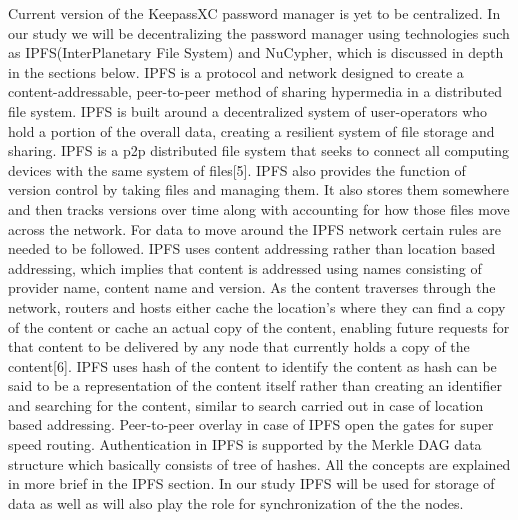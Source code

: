 \documentclass[12pt]{article}
\begin{document}
Current version of the KeepassXC password manager is yet to be centralized. In our study we will be decentralizing the password manager using technologies such as IPFS(InterPlanetary File System) and NuCypher, which is discussed in depth in the sections below. IPFS is a  protocol and network designed to create a content-addressable, peer-to-peer method of sharing hypermedia in a distributed file system.  IPFS is built around a decentralized system of user-operators who hold a portion of the overall data, creating a resilient system of file storage and sharing. IPFS is a p2p distributed file system that seeks to connect all computing devices with the same system of files[5]. IPFS also provides the function of version control by taking files and managing them. It also stores them somewhere and then tracks versions over time along with accounting for how those files move across the network. For data to move around the IPFS network certain rules are needed to be followed. IPFS uses content addressing rather than location based addressing, which implies that content is addressed using names consisting of provider name, content name and version. As the content traverses through the network, routers and hosts either cache the location’s where they can find a copy of the content or cache an actual copy of the content, enabling future requests for that content to be delivered by any node that currently holds a copy of the content[6]. IPFS uses hash of the content to identify the content as hash can be said to be a representation of the content itself rather than creating an identifier and searching for the content, similar to search carried out in case of location based addressing. Peer-to-peer overlay in case of IPFS open the gates for super speed routing. Authentication in IPFS is supported by the Merkle DAG data structure which basically consists of tree of hashes. All the concepts are explained in more brief in the IPFS section. In our study IPFS will be used for storage of data as well as will also play the role for synchronization of the the nodes.
\end{document}
